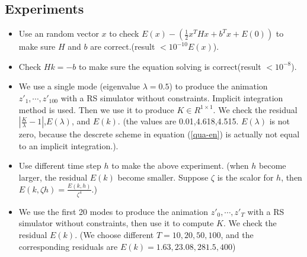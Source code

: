 \documentclass[twocolumn,a4paper]{article}
\begin{document}
\subsection{Experiments}
\begin{itemize}
\item Use an random vector $x$ to check $E(x)-(\frac{1}{2}x^THx+b^Tx+E(0))$ to
  make sure $H$ and $b$ are correct.({\color{red}result $<10^{-10}E(x)$}).
\item Check $Hk = -b$ to make sure the equation solving is
  correct({\color{red}result $<10^{-8}$}).
\item We use a single mode (eigenvalue $\lambda=0.5$) to produce the animation
  $z'_1,\cdots,z'_{100}$ with a RS simulator without constraints. Implicit
  integration method is used. Then we use it to produce $K\in R^{1\times1}$. We
  check the residual $|\frac{K}{\lambda}-1|$,$E(\lambda)$, and
  $E(k)$. ({\color{red}the values are 0.01,4.618,4.515. $E(\lambda)$ is not
    zero, because the descrete scheme in equation (\ref{qua-en}) is actually not
    equal to an implicit integration.}).
\item Use different time step $h$ to make the above
  experiment. ({\color{red}when $h$ become larger, the residual $E(k)$ become
    smaller. Suppose $\zeta$ is the scalor for $h$, then $E(k,\zeta h) =
    \frac{E(k,h)}{\zeta^4}$}.)
\item We use the first 20 modes to produce the animation $z'_0,\cdots,z'_{T}$
  with a RS simulator without constraints, then use it to compute $K$. We check
  the residual $E(k)$. ({\color{red}We choose different $T=10,20,50,100$, and
    the corresponding residuals are $E(k)=1.63,23.08,281.5,400$})
\end{itemize}
\end{document}
